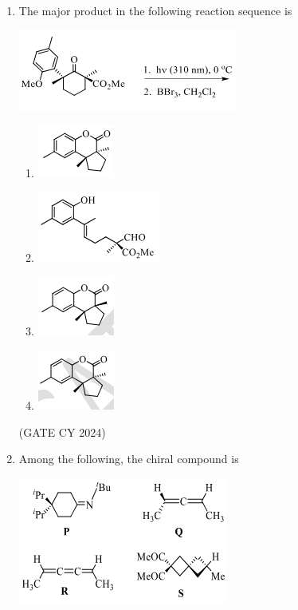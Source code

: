 \documentclass[12pt]{article}
\begin{document}
\begin{enumerate}
\item The major product in the following reaction sequence is

\begin{center}
\includegraphics[width=0.35\columnwidth]{figs/q14.png}
\label{fig:q14}
\end{center}
\begin{enumerate}
\item  \includegraphics[width=0.24\columnwidth]{figs/q14a.png}
\label{fig:q14a}
\item  \includegraphics[width=0.24\columnwidth]{figs/q14b.png}
\label{fig:q14b}
\item  \includegraphics[width=0.24\columnwidth]{figs/q14c.png}
\label{fig:q14c}
\item  \includegraphics[width=0.24\columnwidth]{figs/q14d.png}
\label{fig:q14d}
\end{enumerate}
\hfill (GATE CY 2024)

\item Among the following, the chiral compound is

\begin{center}
\includegraphics[width=0.5\columnwidth]{figs/q15.png}
\end{center}


\end{enumerate}
\end{document}
